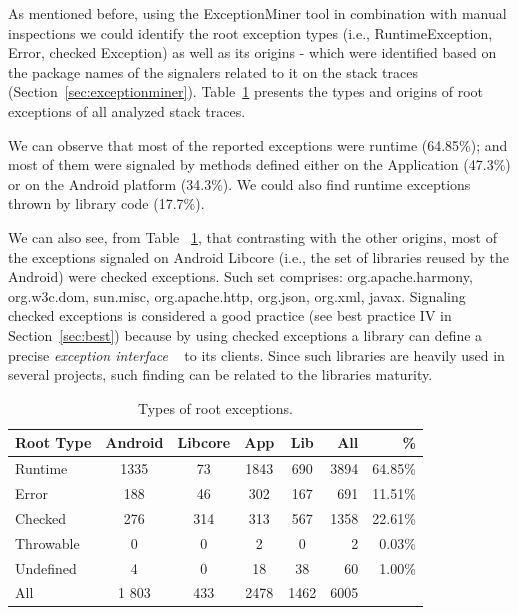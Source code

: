 \documentclass[conference]{IEEEtran}
\begin{document}
As mentioned before, using the ExceptionMiner tool in combination with manual inspections we could identify
the root exception types (i.e., RuntimeException, Error, checked Exception) as well as its origins - which were 
identified based on the package names of the signalers related to it on the stack traces (Section~\ref{sec:exceptionminer}).
Table~\ref{tab:typeroottab} presents the types and origins of root exceptions of all analyzed stack traces. 

We can observe that most of the reported exceptions were runtime 
(64.85\%); and most of them were signaled by methods defined either on the Application (47.3\%)
or on the Android platform (34.3\%). We could also find runtime exceptions thrown by library code (17.7\%).
 
We can also see, from Table ~\ref{tab:typeroottab}, that contrasting with the other origins, most of the 
 exceptions signaled on Android Libcore (i.e., the set of libraries reused by the Android) were 
checked exceptions. Such set comprises: org.apache.harmony, org.w3c.dom, sun.misc, 
org.apache.http, org.json, org.xml, javax. Signaling checked exceptions is considered a 
good practice (see best practice IV in Section~\ref{sec:best}) because by using 
checked exceptions a library can define a precise 
\emph{exception interface} ~\cite{miller1997issues} to its clients.
 Since such libraries are heavily used  in several projects, such finding can be related to the libraries maturity.


\begin{table}
\centering
\begin{tabular}{lccccrr}
    \hline
    \bfseries{Root Type} & \bfseries{Android} & \bfseries{Libcore} & \bfseries{App} & \bfseries{Lib}  & \bfseries{All} & \bfseries{\%} \\
    \hline

Runtime	&	1335	&	73	&	1843	&	690  &	3894 & 64.85\% \\  %
Error	       &	 188              &	 46	&	302             &	167	           &	691 & 11.51\%	\\
Checked	&	276           &	314	&	313          &	567	           &	1358 & 22.61\%	\\
Throwable	&	0	       &	0	&	2            &	0         &	2 & 0.03\%	\\
Undefined	&	4	&	0	&	18		&	38	   &	60	& 1.00\% \\
 \hline
All		& 1  803	&	433	&	2478	&	1462	&	6005 	\\
    \hline
  \end{tabular}
\caption{Types of root exceptions.}
  \label{tab:typeroottab}
\end{table}
\end{document}
